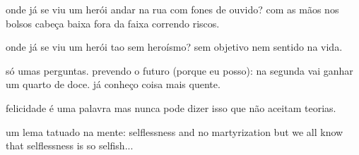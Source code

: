 \begin{poem}
\begin{stanza}
onde já se viu um herói\verseline
andar na rua com\verseline
fones de ouvido?\verseline
com as mãos nos bolsos\verseline
cabeça baixa\verseline
fora da faixa\verseline
correndo riscos.
\end{stanza}
\begin{stanza}
onde já se viu um herói\verseline
tao sem heroísmo?\verseline
sem objetivo nem sentido na vida.
\end{stanza}
\begin{stanza}
só umas perguntas.\verseline
prevendo o futuro (porque eu posso):\verseline
na segunda vai ganhar\verseline
um quarto de doce.\verseline
já conheço coisa mais quente.
\end{stanza}
\begin{stanza}
felicidade é uma palavra\verseline
mas nunca pode dizer isso\verseline
que não aceitam teorias.
\end{stanza}
\begin{stanza}
um lema tatuado na mente:\verseline
selflessness and\verseline
no martyrization\verseline
but we all know that\verseline
selflessness is so selfish...
\end{stanza}
\end{poem}